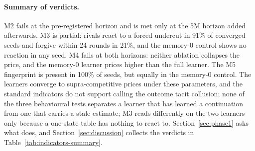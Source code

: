 \paragraph{Summary of verdicts.}
M2 fails at the pre-registered horizon and is met only at the 5M horizon added afterwards. M3 is partial: rivals react to a forced undercut in 91\% of converged seeds and forgive within 24 rounds in 21\%, and the memory-0 control shows no reaction in any seed. M4 fails at both horizons: neither ablation collapses the price, and the memory-0 learner prices higher than the full learner. The M5 fingerprint is present in 100\% of seeds, but equally in the memory-0 control. The learners converge to supra-competitive prices under these parameters, and the standard indicators do not support calling the outcome tacit collusion; none of the three behavioural tests separates a learner that has learned a continuation from one that carries a stale estimate; M3 reads differently on the two learners only because a one-state table has nothing to react to. Section~\ref{sec:phase1} asks what does, and Section~\ref{sec:discussion} collects the verdicts in Table~\ref{tab:indicators-summary}.
